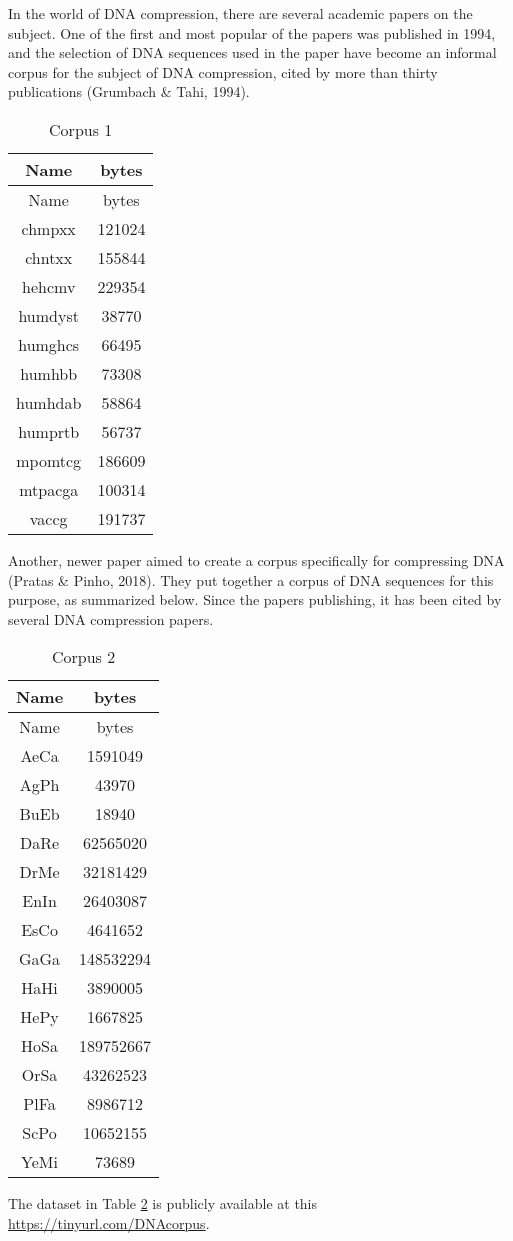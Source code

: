 \documentclass[12pt,twoside]{reedthesis}
\begin{document}
In the world of DNA compression, there are several academic papers on the subject. One of the first and most popular of the papers was published in 1994, and the selection of DNA sequences used in the paper have become an informal corpus for the subject of DNA compression, cited by more than thirty publications (Grumbach \& Tahi, 1994).
\begin{longtable}[]{@{}cc@{}}
\caption{\label{tab:corpus1filesfig}Corpus 1}\tabularnewline
\toprule()
Name & bytes \\
\midrule()
\endfirsthead
\toprule()
Name & bytes \\
\midrule()
\endhead
chmpxx & 121024 \\
chntxx & 155844 \\
hehcmv & 229354 \\
humdyst & 38770 \\
humghcs & 66495 \\
humhbb & 73308 \\
humhdab & 58864 \\
humprtb & 56737 \\
mpomtcg & 186609 \\
mtpacga & 100314 \\
vaccg & 191737 \\
\bottomrule()
\end{longtable}
Another, newer paper aimed to create a corpus specifically for compressing DNA (Pratas \& Pinho, 2018). They put together a corpus of DNA sequences for this purpose, as summarized below. Since the papers publishing, it has been cited by several DNA compression papers.
\begin{longtable}[]{@{}cc@{}}
\caption{\label{tab:corpus2filesfig}Corpus 2}\tabularnewline
\toprule()
Name & bytes \\
\midrule()
\endfirsthead
\toprule()
Name & bytes \\
\midrule()
\endhead
AeCa & 1591049 \\
AgPh & 43970 \\
BuEb & 18940 \\
DaRe & 62565020 \\
DrMe & 32181429 \\
EnIn & 26403087 \\
EsCo & 4641652 \\
GaGa & 148532294 \\
HaHi & 3890005 \\
HePy & 1667825 \\
HoSa & 189752667 \\
OrSa & 43262523 \\
PlFa & 8986712 \\
ScPo & 10652155 \\
YeMi & 73689 \\
\bottomrule()
\end{longtable}
The dataset in Table \ref{tab:corpus2filesfig} is publicly available at this \url{https://tinyurl.com/DNAcorpus}.
\end{document}
